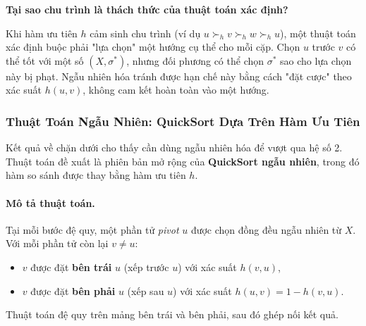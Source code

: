 \begin{morong}
\textbf{Tại sao chu trình là thách thức của thuật toán xác định?}

Khi hàm ưu tiên $h$ cảm sinh chu trình (ví dụ $u \succ_h v \succ_h w \succ_h u$), một thuật toán xác định buộc phải "lựa chọn" một hướng cụ thể cho mỗi cặp. Chọn $u$ trước $v$ có thể tốt với một số $(X, \sigma^*)$, nhưng đối phương có thể chọn $\sigma^*$ sao cho lựa chọn này bị phạt. Ngẫu nhiên hóa tránh được hạn chế này bằng cách "đặt cược" theo xác suất $h(u,v)$, không cam kết hoàn toàn vào một hướng.
\end{morong}

\subsubsection{Thuật Toán Ngẫu Nhiên: QuickSort Dựa Trên Hàm Ưu Tiên}
\label{sec:quicksort_pref}

Kết quả về chặn dưới cho thấy cần dùng ngẫu nhiên hóa để vượt qua hệ số 2. Thuật toán đề xuất là phiên bản mở rộng của \textbf{QuickSort ngẫu nhiên}, trong đó hàm so sánh được thay bằng hàm ưu tiên $h$.

\paragraph{Mô tả thuật toán.}
Tại mỗi bước đệ quy, một phần tử \emph{pivot} $u$ được chọn đồng đều ngẫu nhiên từ $X$. Với mỗi phần tử còn lại $v \neq u$:
\begin{itemize}
    \item $v$ được đặt \textbf{bên trái} $u$ (xếp trước $u$) với xác suất $h(v, u)$,
    \item $v$ được đặt \textbf{bên phải} $u$ (xếp sau $u$) với xác suất $h(u, v) = 1 - h(v,u)$.
\end{itemize}
Thuật toán đệ quy trên mảng bên trái và bên phải, sau đó ghép nối kết quả.

